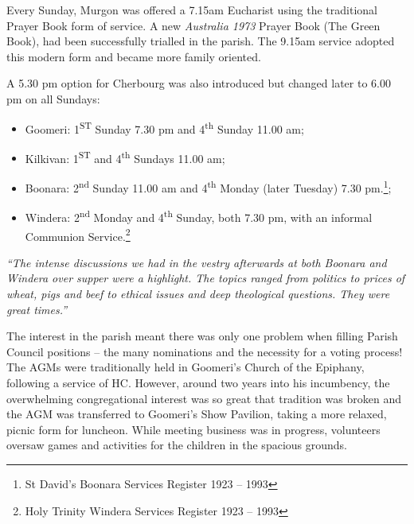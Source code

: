 Every Sunday, Murgon was offered a 7.15am Eucharist using the traditional Prayer Book form of service. A new \emph{Australia 1973} Prayer Book (The Green Book), had been successfully trialled in the parish. The 9.15am service adopted this modern form and became more family oriented.



A 5.30 pm option for Cherbourg was also introduced but changed later to 6.00 pm on all Sundays:



\begin{itemize}

\item

  Goomeri: 1\textsuperscript{ST} Sunday 7.30 pm and 4\textsuperscript{th} Sunday 11.00 am;

\item

  Kilkivan: 1\textsuperscript{ST} and 4\textsuperscript{th} Sundays 11.00 am;

\end{itemize}



\begin{itemize}

\item

  Boonara: 2\textsuperscript{nd} Sunday 11.00 am and 4\textsuperscript{th} Monday (later Tuesday) 7.30 pm.\footnote{St David's Boonara Services Register 1923 -- 1993};
\item

  Windera: 2\textsuperscript{nd} Monday and 4\textsuperscript{th} Sunday, both 7.30 pm, with an informal Communion Service.\footnote{Holy Trinity Windera Services Register 1923 -- 1993}
\end{itemize}



\emph{``The intense discussions we had in the vestry afterwards at both Boonara and Windera over supper were a highlight. The topics ranged from politics to prices of wheat, pigs and beef to ethical issues and deep theological questions. They were great times.''}



The interest in the parish meant there was only one problem when filling Parish Council positions -- the many nominations and the necessity for a voting process! The AGMs were traditionally held in Goomeri's Church of the Epiphany, following a service of HC. However, around two years into his incumbency, the overwhelming congregational interest was so great that tradition was broken and the AGM was transferred to Goomeri's Show Pavilion, taking a more relaxed, picnic form for luncheon. While meeting business was in progress, volunteers oversaw games and activities for the children in the spacious grounds.



